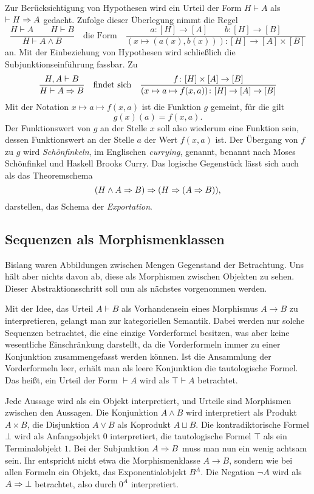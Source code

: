 Zur Berücksichtigung von Hypothesen wird ein Urteil der Form
$H\vdash A$ als $\vdash H\Rightarrow A$ gedacht. Zufolge dieser Überlegung
nimmt die Regel
\[\dfrac{H\vdash A\qquad H\vdash B}
{H\vdash A\land B}\quad\text{die Form}\quad
\dfrac{a\colon [H]\to [A]\qquad b\colon [H]\to [B]}
{(x\mapsto (a(x),b(x)))\colon [H]\to [A]\times [B]}\]
an. Mit der Einbeziehung von Hypothesen wird schließlich
die Subjunktionseinführung fassbar. Zu
\[\dfrac{H,A\vdash B}
{H\vdash A\Rightarrow B}\quad\text{findet sich}\quad
\dfrac{f\colon [H]\times [A]\to [B]}
{(x\mapsto a\mapsto f(x, a))\colon [H]\to [A]\to [B]}\]
Mit der Notation $x\mapsto a\mapsto f(x, a)$ ist die Funktion $g$
gemeint, für die gilt
\[g(x)(a) = f(x, a).\]
Der Funktionswert von $g$ an der Stelle $x$ soll also wiederum eine
Funktion sein, dessen Funktionswert an der Stelle $a$ der Wert
$f(x, a)$ ist. Der Übergang von $f$ zu $g$ wird \emph{Schönfinkeln}, im
Englischen \emph{currying}, genannt, benannt nach Moses Schönfinkel und
Haskell Brooks Curry. Das logische Gegenstück lässt sich auch als das
Theoremschema
\[(H\land A\Rightarrow B)\Rightarrow (H\Rightarrow (A\Rightarrow B)),\]
darstellen, das Schema der \emph{Exportation}.

\subsection{Sequenzen als Morphismenklassen}

Bislang waren Abbildungen zwischen Mengen Gegenstand der Betrachtung.
Uns hält aber nichts davon ab, diese als Morphismen zwischen
Objekten zu sehen. Dieser Abstraktionsschritt soll nun als nächstes
vorgenommen werden.

Mit der Idee, das Urteil $A\vdash B$ als Vorhandensein eines
Morphismus $A\to B$ zu interpretieren, gelangt man zur kategoriellen
Semantik. Dabei werden nur solche Sequenzen betrachtet, die eine einzige
Vorderformel besitzen, was aber keine wesentliche Einschränkung
darstellt, da die Vorderformeln immer zu einer Konjunktion
zusammengefasst werden können. Ist die Ansammlung der Vorderformeln
leer, erhält man als leere Konjunktion die tautologische Formel.
Das heißt, ein Urteil der Form $\vdash A$ wird als $\top\vdash A$
betrachtet.

Jede Aussage wird als ein Objekt interpretiert, und Urteile sind
Morphismen zwischen den Aussagen. Die Konjunktion $A\land B$
wird interpretiert als Produkt $A\times B$, die Disjunktion $A\lor B$
als Koprodukt $A\sqcup B$. Die kontradiktorische Formel $\bot$ wird als
Anfangsobjekt $0$ interpretiert, die tautologische Formel $\top$ als
ein Terminalobjekt $1$. Bei der Subjunktion $A\Rightarrow B$ muss man nun ein
wenig achtsam sein. Ihr entspricht nicht etwa die Morphismenklasse
$A\to B$, sondern wie bei allen Formeln ein Objekt, das Exponentialobjekt
$B^A$. Die Negation $\lnot A$ wird als $A\Rightarrow\bot$ betrachtet, also
durch $0^A$ interpretiert.

